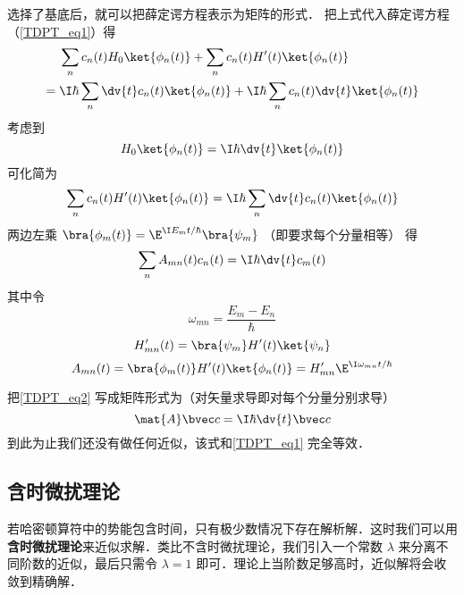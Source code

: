 选择了基底后，就可以把薛定谔方程表示为矩阵的形式． %
把上式代入薛定谔方程（\autoref{TDPT_eq1}）得
\begin{equation}
\begin{aligned}
&\sum_n c_n(t) H_0 \ket{\phi_n(t)} + \sum_n c_n(t) H'(t) \ket{\phi_n(t)} \\ 
={} &\I\hbar \sum_n \dv{t} c_n(t) \ket{\phi_n(t)}
+ \I\hbar \sum_n c_n(t) \dv{t} \ket{\phi_n(t)}
\end{aligned}
\end{equation}
考虑到
\begin{equation}
H_0\ket{\phi_n(t)} = \I\hbar \dv{t} \ket{\phi_n(t)}
\end{equation}
可化简为
\begin{equation}
\sum_n c_n(t) H'(t) \ket{\phi_n(t)}
= \I\hbar \sum_n \dv{t} c_n(t) \ket{\phi_n(t)}
\end{equation}
两边左乘 $\bra{\phi_m(t)} = \E^{\I E_m t/\hbar}\bra{\psi_m}$ （即要求每个分量相等） 得
\begin{equation}\label{TDPT_eq2}
\sum_n A_{mn}(t) c_n(t)
= \I\hbar \dv{t} c_m(t)
\end{equation}
其中令
\begin{equation}
\omega_{mn} = \frac{E_m-E_n}{\hbar}
\end{equation}
\begin{equation}
H'_{mn}(t) = \bra{\psi_m} H'(t)\ket{\psi_n}
\end{equation}
\begin{equation}\label{TDPT_eq7}
A_{mn}(t) = \bra{\phi_m(t)} H'(t) \ket{\phi_n(t)} = H'_{mn} \E^{\I\omega_{mn}t/\hbar}
\end{equation}

把\autoref{TDPT_eq2} 写成矩阵形式为（对矢量求导即对每个分量分别求导）
\begin{equation}\label{TDPT_eq3}
\mat {A} \bvec c = \I\hbar \dv{t} \bvec c
\end{equation}
到此为止我们还没有做任何近似，该式和\autoref{TDPT_eq1} 完全等效．

\subsection{含时微扰理论}
若哈密顿算符中的势能包含时间，只有极少数情况下存在解析解．这时我们可以用\textbf{含时微扰理论}来近似求解．类比不含时微扰理论，我们引入一个常数 $\lambda$ 来分离不同阶数的近似，最后只需令 $\lambda = 1$ 即可．理论上当阶数足够高时，近似解将会收敛到精确解．%

